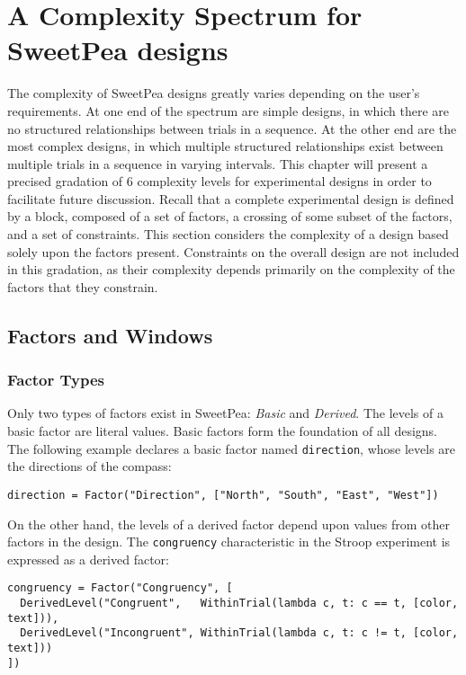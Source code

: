 
\chapter{A Complexity Spectrum for SweetPea designs}

The complexity of SweetPea designs greatly varies depending on the user's requirements. At one end of the spectrum are simple designs, in which there are no structured relationships between trials in a sequence. At the other end are the most complex designs, in which multiple structured relationships exist between multiple trials in a sequence in varying intervals. This chapter will present a precised gradation of 6 complexity levels for experimental designs in order to facilitate future discussion. Recall that a complete experimental design is defined by a block, composed of a set of factors, a crossing of some subset of the factors, and a set of constraints. This section considers the complexity of a design based solely upon the factors present. Constraints on the overall design are not included in this gradation, as their complexity depends primarily on the complexity of the factors that they constrain.


\section{Factors and Windows}

\subsection{Factor Types}

Only two types of factors exist in SweetPea: \textit{Basic} and \textit{Derived}. The levels of a basic factor are literal values. Basic factors form the foundation of all designs. The following example declares a basic factor named \texttt{direction}, whose levels are the directions of the compass:

\begin{verbatim}
direction = Factor("Direction", ["North", "South", "East", "West"])
\end{verbatim}

On the other hand, the levels of a derived factor depend upon values from other factors in the design. The \texttt{congruency} characteristic in the Stroop experiment is expressed as a derived factor:

\begin{verbatim}
congruency = Factor("Congruency", [
  DerivedLevel("Congruent",   WithinTrial(lambda c, t: c == t, [color, text])),
  DerivedLevel("Incongruent", WithinTrial(lambda c, t: c != t, [color, text]))
])
\end{verbatim}

